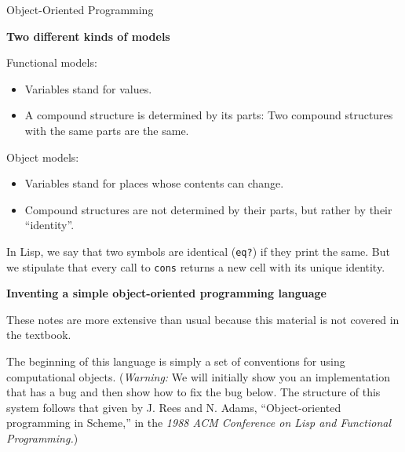 





\vskip 10pt

\centerline{Object-Oriented Programming}

\medskip

{\bf Two different kinds of models}

Functional models:

\begin{itemize}

\item     Variables stand for values.

\item     A compound structure is determined by its parts: Two compound
structures with the same parts are the same.

\end{itemize}

Object models:

\begin{itemize}

\item    Variables stand for places whose contents can change.

\item     Compound structures are not determined by their parts, but
rather by their ``identity''. 

\end{itemize}

In Lisp, we say that two symbols are identical ({\tt eq?}) if they
print the same.  But we stipulate that every call to {\tt cons}
returns a new cell with its unique identity.


\vskip 20pt


{\bf Inventing a simple object-oriented programming language}

These notes are more extensive than usual because this material is not covered in the textbook.

The beginning of this language is simply a set of conventions for using
computational objects.  ({\it Warning:}  We will initially show you an
implementation that has a bug and then show how to fix the bug below.
The structure of this system follows that given by J. Rees and N. Adams,
``Object-oriented programming in Scheme,'' in the {\it 1988 ACM Conference
on Lisp and Functional Programming.})

